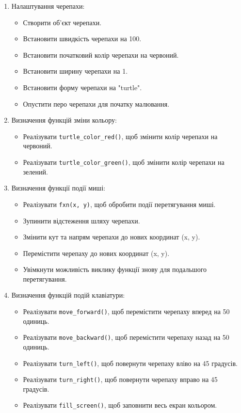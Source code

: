 \documentclass[12pt]{article}
\begin{document}
\begin{enumerate}[label=\arabic*.]
\item Налаштування черепахи:
\begin{itemize}
\item Створити об'єкт черепахи.
\item Встановити швидкість черепахи на 100.
\item Встановити початковий колір черепахи на червоний.
\item Встановити ширину черепахи на 1.
\item Встановити форму черепахи на "turtle".
\item Опустити перо черепахи для початку малювання.
\end{itemize}

\item Визначення функцій зміни кольору:
\begin{itemize}
\item Реалізувати \texttt{turtle_color_red()}, щоб змінити колір черепахи на червоний.
\item Реалізувати \texttt{turtle_color_green()}, щоб змінити колір черепахи на зелений.
\end{itemize}

\item Визначення функції події миші:
\begin{itemize}
\item Реалізувати \texttt{fxn(x, y)}, щоб обробити події перетягування миші.
\item Зупинити відстеження шляху черепахи.
\item Змінити кут та напрям черепахи до нових координат (x, y).
\item Перемістити черепаху до нових координат (x, y).
\item Увімкнути можливість виклику функції знову для подальшого перетягування.
\end{itemize}

\item Визначення функцій подій клавіатури:
\begin{itemize}
\item Реалізувати \texttt{move_forward()}, щоб перемістити черепаху вперед на 50 одиниць.
\item Реалізувати \texttt{move_backward()}, щоб перемістити черепаху назад на 50 одиниць.
\item Реалізувати \texttt{turn_left()}, щоб повернути черепаху вліво на 45 градусів.
\item Реалізувати \texttt{turn_right()}, щоб повернути черепаху вправо на 45 градусів.
\item Реалізувати \texttt{fill_screen()}, щоб заповнити весь екран кольором.
\end{itemize}


\end{enumerate}
\end{document}
